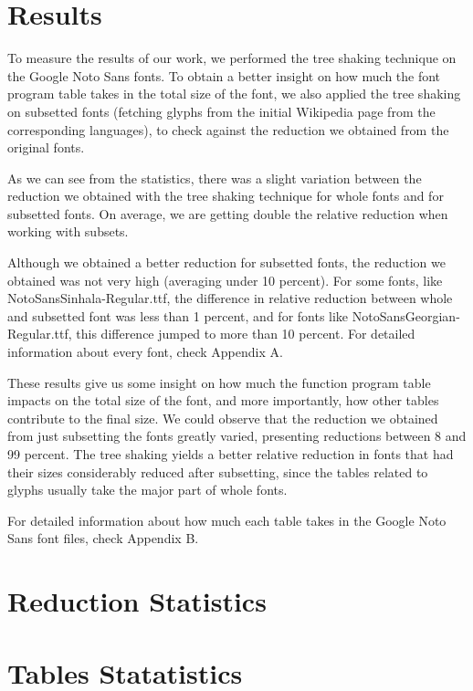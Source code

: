 \documentclass[12pt]{article}
\begin{document}
\section{Results}

To measure the results of our work, we performed the tree shaking
technique on the Google Noto Sans fonts\cite{notosans}. To obtain a
better insight on how much the font program table takes in the total
size of the font, we also applied the tree shaking on  subsetted fonts
(fetching glyphs from the initial Wikipedia page from the corresponding
languages), to check against the reduction we obtained from the original
fonts.



As we can see from the statistics, there was a slight variation between
the reduction we obtained with the tree shaking technique for whole
fonts and for subsetted fonts. On average, we are getting double the
relative reduction when working with subsets. 

Although we obtained a better reduction for subsetted fonts, the
reduction we obtained was not very high (averaging under 10 percent). For
some fonts, like NotoSansSinhala-Regular.ttf, the difference in relative
reduction between whole and subsetted font was less than 1 percent, and
for fonts like NotoSansGeorgian-Regular.ttf, this difference jumped to
more than 10 percent. For detailed information about every font, check
Appendix A.

These results give us some insight on how much the function program
table impacts on the total size of the font, and more importantly, how
other tables contribute to the final size. We could observe that the
reduction we obtained from just subsetting the fonts greatly
varied, presenting reductions between 8 and 99 percent. The tree shaking
yields a better relative reduction in fonts that had their sizes
considerably reduced after subsetting, since the tables related to
glyphs usually take the major part of whole fonts.

For detailed information about how much each table takes in the Google
Noto Sans font files, check Appendix B.

\clearpage
\begin{appendices}
\section{Reduction Statistics}



\section{Tables Statatistics}


\end{appendices}
\end{document}
